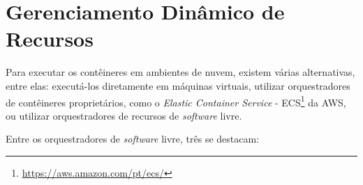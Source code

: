 


\section{Gerenciamento Dinâmico de Recursos}

Para executar os contêineres em ambientes de nuvem, existem várias alternativas, entre elas: executá-los diretamente em máquinas virtuais, utilizar orquestradores de contêineres proprietários, como o \textit{Elastic Container Service} - ECS\footnote{\url{https://aws.amazon.com/pt/ecs/}} da AWS, ou utilizar orquestradores de recursos de \textit{software} livre.



Entre os orquestradores de \textit{software} livre, três se destacam:

